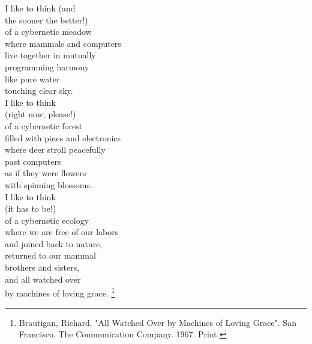 \documentclass[11pt]{article}
\begin{document}
\begin{singlespace}
\noindent I like to think (and\\
the sooner the better!)\\
of a cybernetic meadow\\
where mammals and computers\\
live together in mutually\\
programming harmony\\
like pure water\\
touching clear sky.\\

\noindent I like to think\\
\indent (right now, please!)\\
of a cybernetic forest\\
filled with pines and electronics\\
where deer stroll peacefully\\
past computers\\
as if they were flowers\\
with spinning blossoms. \\

\noindent I like to think\\
\indent (it has to be!)\\
of a cybernetic ecology\\
where we are free of our labors\\
and joined back to nature,\\
returned to our mammal\\
brothers and sisters,\\
and all watched over\\
by machines of loving grace.
\footnote{Brautigan, Richard. "All Watched Over by Machines of Loving Grace". San Francisco. The Communication Company. 1967. Print.}
\end{singlespace}
\newpage



\newpage
\end{document}
